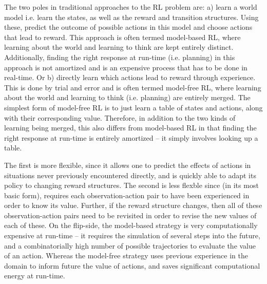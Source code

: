 
The two poles in traditional approaches to the RL problem are: a) learn a world model i.e. learn the states, as well as the reward and transition structures. Using these, predict the outcome of possible actions in this model and choose actions that lead to reward. This approach is often termed model-based RL, where learning about the world and learning to think are kept entirely distinct. Additionally, finding the right response at run-time (i.e. planning) in this approach is not amortized and is an expensive process that has to be done in real-time. Or b) directly learn which actions lead to reward through experience. This is done by trial and error and is often termed model-free RL, where learning about the world and learning to think (i.e. planning) are entirely merged. The simplest form of model-free RL is to just learn a table of states and actions, along with their corresponding value. Therefore, in addition to the two kinds of learning being merged, this also differs from model-based RL in that finding the right response at run-time is entirely amortized -- it simply involves looking up a table.

The first is more flexible, since it allows one to predict the effects of actions in situations never previously encountered directly, and is quickly able to adapt its policy to changing reward structures. The second is less flexble since (in its most basic form), requires each observation-action pair to have been experienced in order to know its value. Further, if the reward structure changes, then all of these observation-action pairs need to be revisited in order to revise the new values of each of these. On the flip-side, the model-based strategy is very computationally expensive at run-time -- it requires the simulation of several steps into the future, and a combinatorially high number of possible trajectories to evaluate the value of an action. Whereas the model-free strategy uses previous experience in the domain to inform future the value of actions, and saves significant computational energy at run-time.

